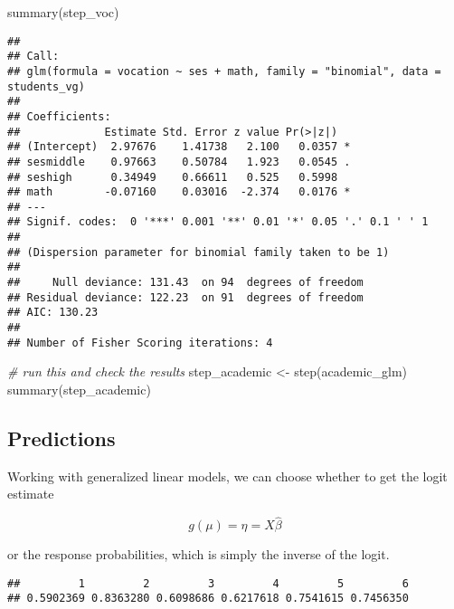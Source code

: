 \documentclass[
  oneside]{book}
\newenvironment{Shaded}{\begin{snugshade}}{\end{snugshade}}
\newcommand{\CommentTok}[1]{\textcolor[rgb]{0.56,0.35,0.01}{\textit{#1}}}
\newcommand{\FunctionTok}[1]{\textcolor[rgb]{0.00,0.00,0.00}{#1}}
\newcommand{\NormalTok}[1]{#1}
\newcommand{\OtherTok}[1]{\textcolor[rgb]{0.56,0.35,0.01}{#1}}
\newcommand{\SpecialCharTok}[1]{\textcolor[rgb]{0.00,0.00,0.00}{#1}}
\begin{document}
\begin{Shaded}
\begin{Highlighting}[]
\FunctionTok{summary}\NormalTok{(step\_voc)}
\end{Highlighting}
\end{Shaded}

\begin{verbatim}
## 
## Call:
## glm(formula = vocation ~ ses + math, family = "binomial", data = students_vg)
## 
## Coefficients:
##             Estimate Std. Error z value Pr(>|z|)  
## (Intercept)  2.97676    1.41738   2.100   0.0357 *
## sesmiddle    0.97663    0.50784   1.923   0.0545 .
## seshigh      0.34949    0.66611   0.525   0.5998  
## math        -0.07160    0.03016  -2.374   0.0176 *
## ---
## Signif. codes:  0 '***' 0.001 '**' 0.01 '*' 0.05 '.' 0.1 ' ' 1
## 
## (Dispersion parameter for binomial family taken to be 1)
## 
##     Null deviance: 131.43  on 94  degrees of freedom
## Residual deviance: 122.23  on 91  degrees of freedom
## AIC: 130.23
## 
## Number of Fisher Scoring iterations: 4
\end{verbatim}

\begin{Shaded}
\begin{Highlighting}[]
\CommentTok{\# run this and check the results}
\NormalTok{step\_academic }\OtherTok{\textless{}{-}} \FunctionTok{step}\NormalTok{(academic\_glm)}
\FunctionTok{summary}\NormalTok{(step\_academic)}
\end{Highlighting}
\end{Shaded}

\hypertarget{predictions}{%
\subsection{Predictions}\label{predictions}}

Working with generalized linear models, we can choose whether to get the
logit estimate

\[
g(\mu) = \eta = X \hat\beta
\]

or the response probabilities, which is simply the inverse of the logit.

\begin{Shaded}
\end{Shaded}

\begin{verbatim}
##         1         2         3         4         5         6 
## 0.5902369 0.8363280 0.6098686 0.6217618 0.7541615 0.7456350
\end{verbatim}
\end{document}
